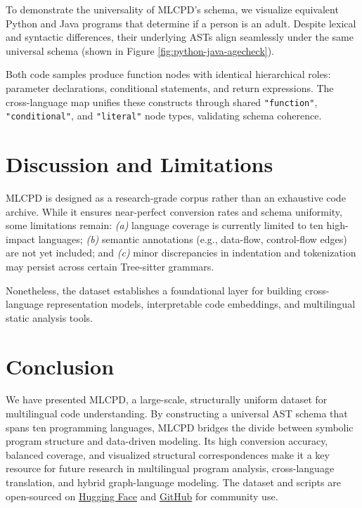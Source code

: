\documentclass{article}
\begin{document}
To demonstrate the universality of MLCPD’s schema,
we visualize equivalent Python and Java programs that determine if a person is an adult.
Despite lexical and syntactic differences, their underlying ASTs align seamlessly under the same universal schema (shown in Figure \ref{fig:python-java-agecheck}).

Both code samples produce function nodes with identical hierarchical roles:
parameter declarations, conditional statements, and return expressions.
The cross-language map unifies these constructs through shared \texttt{"function"}, \texttt{"conditional"}, and \texttt{"literal"} node types, validating schema coherence.

\section{Discussion and Limitations}

MLCPD is designed as a research-grade corpus rather than an exhaustive code archive.
While it ensures near-perfect conversion rates and schema uniformity, some limitations remain:
\textit{(a)} language coverage is currently limited to ten high-impact languages;
\textit{(b)} semantic annotations (e.g., data-flow, control-flow edges) are not yet included;
and \textit{(c)} minor discrepancies in indentation and tokenization may persist across certain Tree-sitter grammars.

Nonetheless, the dataset establishes a foundational layer for building
cross-language representation models, interpretable code embeddings, and multilingual static analysis tools.

\section{Conclusion}

We have presented MLCPD, a large-scale, structurally uniform dataset for multilingual code understanding. By constructing a universal AST schema that spans ten programming languages, MLCPD bridges the divide between symbolic program structure and data-driven modeling. Its high conversion accuracy, balanced coverage, and visualized structural correspondences make it a key resource for future research in multilingual program analysis, cross-language translation, and hybrid graph-language modeling. The dataset and scripts are open-sourced on \href{https://huggingface.co/datasets/jugalgajjar/MultiLang-Code-Parser-Dataset}{Hugging Face} and \href{https://github.com/JugalGajjar/MultiLang-Code-Parser-Dataset}{GitHub} for community use.
\end{document}
